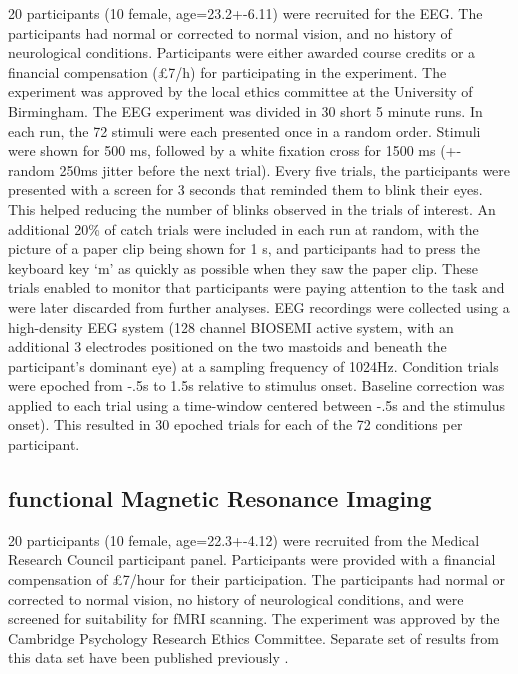 \documentclass[10pt,letterpaper]{article}
\begin{document}
20 participants (10 female, age=23.2+-6.11) were recruited for the 
EEG. The participants had normal or corrected to normal vision, 
and no history of neurological conditions. Participants were either 
awarded course credits or a financial compensation (£7/h) for 
participating in the experiment. The experiment was approved by the 
local ethics committee at the University of Birmingham.
The EEG experiment was divided in 30 short 5 minute runs. In each run, 
the 72 stimuli were each presented once in a random order. Stimuli were 
shown for 500 ms, followed by a white fixation cross for 1500 ms (+- 
random 250ms jitter before the next trial). Every five trials, the 
participants were presented with a screen for 3 seconds that reminded 
them to blink their eyes. This helped reducing the number of blinks 
observed in the trials of interest. An additional 20\% of catch trials 
were included in each run at random, with the picture of a paper clip 
being shown for 1 s, and participants had to press the keyboard key ‘m’ 
as quickly as possible when they saw the paper clip. These trials enabled 
to monitor that participants were paying attention to the task and were 
later discarded from further analyses. EEG recordings were collected 
using a high-density EEG system (128 channel BIOSEMI active system, 
with an additional 3 electrodes positioned on the two mastoids and 
beneath the participant’s dominant eye) at a sampling frequency of 
1024Hz. Condition trials were epoched from -.5s to 1.5s relative to 
stimulus onset.  Baseline correction was applied to each trial using 
a time-window centered between -.5s and the stimulus onset). This 
resulted in 30 epoched trials for each of the 72 conditions per participant.

\subsection{functional Magnetic Resonance Imaging}

20 participants (10 female, age=22.3+-4.12) were recruited from the 
Medical Research Council participant panel. Participants were provided 
with a financial compensation of £7/hour for their participation. The 
participants had normal or corrected to normal vision, no history of 
neurological conditions, and were screened for suitability for fMRI 
scanning. The experiment was approved by the Cambridge Psychology 
Research Ethics Committee. Separate set of results from this data 
set have been published previously \cite{Charest2014-zn}.
\end{document}
